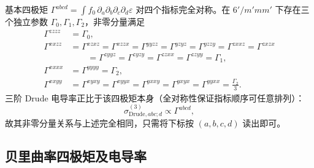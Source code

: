 基本四极矩 \(\Gamma^{abcd}=\int f_0\,\partial_{a}\partial_{b}\partial_{c}\partial_{d}\varepsilon\) 对四个指标完全对称。在 \(6'/m'mm'\) 下存在三个独立参数 \(\Gamma_{0},\Gamma_{1},\Gamma_{2}\)，非零分量满足
\begin{equation}
\begin{aligned}
  \Gamma^{zzzz} &= \Gamma_{0},\\
  \Gamma^{xxzz} &= \Gamma^{xzxz} = \Gamma^{xzzx}
                = \Gamma^{yyzz} = \Gamma^{yzyz} = \Gamma^{yzzy}
                = \Gamma^{zxxz} = \Gamma^{zxzx}  \\
               &\qquad = \Gamma^{zyyz} = \Gamma^{zyzy}
                = \Gamma^{zzxx} = \Gamma^{zzyy} = \Gamma_{1},\\
  \Gamma^{xxxx} &= \Gamma^{yyyy} = \Gamma_{2},\\
  \Gamma^{xxyy} &= \Gamma^{xyxy} = \Gamma^{xyyx} = \Gamma^{yxxy}
                = \Gamma^{yxyx} = \Gamma^{yyxx} = \frac{\Gamma_{2}}{3}.
\end{aligned}
\end{equation}
三阶 Drude 电导率正比于该四极矩本身（全对称性保证指标顺序可任意排列）：
\begin{equation}
  \sigma^{(3)}_{\mathrm{Drude}, abc;d} \propto \Gamma^{abcd},
\end{equation}
故其非零分量关系与上述完全相同，只需将下标按 \((a,b,c,d)\) 读出即可。

\subsection{贝里曲率四极矩及电导率}

